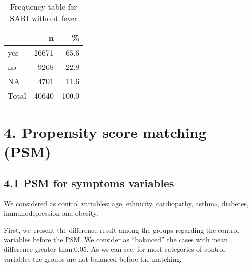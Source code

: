 \documentclass[
]{article}
\newenvironment{Shaded}{\begin{snugshade}}{\end{snugshade}}
\newcommand{\DataTypeTok}[1]{\textcolor[rgb]{0.13,0.29,0.53}{#1}}
\newcommand{\DecValTok}[1]{\textcolor[rgb]{0.00,0.00,0.81}{#1}}
\newcommand{\KeywordTok}[1]{\textcolor[rgb]{0.13,0.29,0.53}{\textbf{#1}}}
\newcommand{\NormalTok}[1]{#1}
\newcommand{\OperatorTok}[1]{\textcolor[rgb]{0.81,0.36,0.00}{\textbf{#1}}}
\newcommand{\OtherTok}[1]{\textcolor[rgb]{0.56,0.35,0.01}{#1}}
\newcommand{\StringTok}[1]{\textcolor[rgb]{0.31,0.60,0.02}{#1}}
\begin{document}
\begin{Shaded}
\end{Shaded}

\begin{table}[!h]

\caption{\label{tab:unnamed-chunk-80}Frequency table for SARI without fever}
\centering
\begin{tabular}[t]{l|r|r}
\hline
  & n & \%\\
\hline
yes & 26671 & 65.6\\
\hline
no & 9268 & 22.8\\
\hline
NA & 4701 & 11.6\\
\hline
Total & 40640 & 100.0\\
\hline
\end{tabular}
\end{table}

\hypertarget{propensity-score-matching-psm}{%
\section{4. Propensity score matching
(PSM)}\label{propensity-score-matching-psm}}

\hypertarget{psm-for-symptoms-variables}{%
\subsection{4.1 PSM for symptoms
variables}\label{psm-for-symptoms-variables}}

We considered as control variables: age, ethnicity, cardiopathy, asthma,
diabetes, immunodepression and obesity.

First, we present the difference result among the groups regarding the
control variables before the PSM. We consider as ``balanced'' the cases
with mean difference greater than 0.05. As we can see, for most
categories of control variables the groups are not balanced before the
matching.
\end{document}
